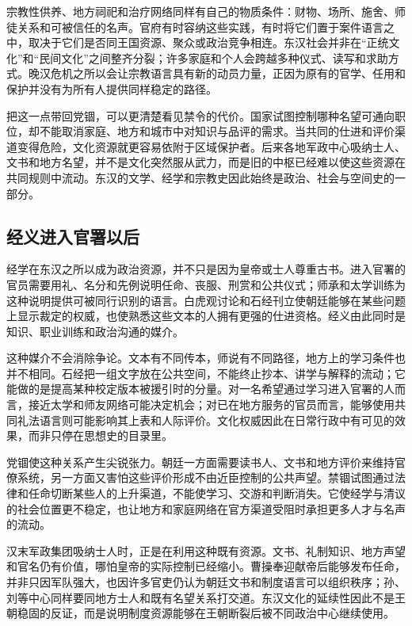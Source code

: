 宗教性供养、地方祠祀和治疗网络同样有自己的物质条件：财物、场所、施舍、师徒关系和可被信任的名声。官府有时容纳这些实践，有时将它们置于案件语言之中，取决于它们是否同王国资源、聚众或政治竞争相连。东汉社会并非在“正统文化”和“民间文化”之间整齐分裂；许多家庭和个人会跨越多种仪式、读写和求助方式。晚汉危机之所以会让宗教语言具有新的动员力量，正因为原有的官学、任用和保护并没有为所有人提供同样稳定的路径。

把这一点带回党锢，可以更清楚看见禁令的代价。国家试图控制哪种名望可通向职位，却不能取消家庭、地方和城市中对知识与品评的需求。当共同的仕进和评价渠道变得危险，文化资源就更容易依附于区域保护者。后来各地军政中心吸纳士人、文书和地方名望，并不是文化突然服从武力，而是旧的中枢已经难以使这些资源在共同规则中流动。东汉的文学、经学和宗教史因此始终是政治、社会与空间史的一部分。

\subsection{经义进入官署以后}

经学在东汉之所以成为政治资源，并不只是因为皇帝或士人尊重古书。进入官署的官员需要用礼、名分和先例说明任命、丧服、刑赏和公共仪式；师承和太学训练为这种说明提供可被同行识别的语言。白虎观讨论和石经刊立使朝廷能够在某些问题上显示裁定的权威，也使熟悉这些文本的人拥有更强的仕进资格。经义由此同时是知识、职业训练和政治沟通的媒介。

这种媒介不会消除争论。文本有不同传本，师说有不同路径，地方上的学习条件也并不相同。石经把一组文字放在公共空间，不能终止抄本、讲学与解释的流动；它能做的是提高某种校定版本被援引时的分量。对一名希望通过学习进入官署的人而言，接近太学和师友网络可能决定机会；对已在地方服务的官员而言，能够使用共同礼法语言则可能影响其上表和人际评价。文化权威因此在日常行政中有可见的效果，而非只停在思想史的目录里。

党锢使这种关系产生尖锐张力。朝廷一方面需要读书人、文书和地方评价来维持官僚系统，另一方面又害怕这些评价形成不由近臣控制的公共声望。禁锢试图通过法律和任命切断某些人的上升渠道，不能使学习、交游和判断消失。它使经学与清议的社会位置更不稳定，也让地方和家庭网络在官方渠道受阻时承担更多人才与名声的流动。

汉末军政集团吸纳士人时，正是在利用这种既有资源。文书、礼制知识、地方声望和官名仍有价值，哪怕皇帝的实际控制已经缩小。曹操奉迎献帝后能够发布任命，并非只因军队强大，也因许多官吏仍认为朝廷文书和制度语言可以组织秩序；孙、刘等中心同样要同地方士人和既有名望关系打交道。东汉文化的延续性因此不是王朝稳固的反证，而是说明制度资源能够在王朝断裂后被不同政治中心继续使用。

